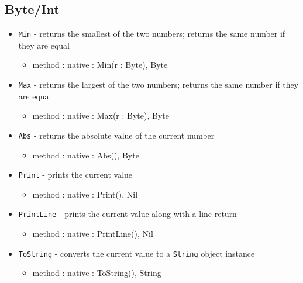 \documentclass[12pt]{article}
\begin{document}
\subsection{Byte/Int}
\begin{itemize}
    \item \texttt{Min} - returns the smallest of the two numbers; returns the same number if they are equal
    	\begin{itemize}
	\item method : native : Min(r : Byte), Byte
	\end{itemize}
    \item \texttt{Max} - returns the largest of the two numbers; returns the same number if they are equal
    	\begin{itemize}
	\item method : native : Max(r : Byte), Byte
	\end{itemize}
    \item \texttt{Abs} - returns the absolute value of the current number
    	\begin{itemize}
	\item method : native : Abs(), Byte
	\end{itemize}
    \item \texttt{Print} - prints the current value
    	\begin{itemize}
	\item method : native : Print(), Nil
	\end{itemize}
    \item \texttt{PrintLine} - prints the current value along with a line return
    	\begin{itemize}
	\item method : native : PrintLine(), Nil
	\end{itemize}
    \item \texttt{ToString} - converts the current value to a \texttt{String} object instance
   	\begin{itemize}
	\item method : native : ToString(), String
	\end{itemize}
\end{itemize}
\end{document}
